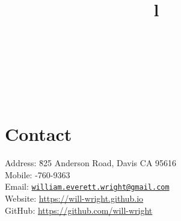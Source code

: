 \documentclass[12pt,margintitle,line]{res}
\begin{document}
\pagestyle{fancy}  
\fancyhf{}                  %
\renewcommand{\headrulewidth}{0.0pt}



\begin{resume}

\fancyhead{} %
\cfoot{\thepage}

\begin{format}
\\
\title{l}\\
\body\\
\end{format}

\section{Contact}
\vspace{-0.45cm}
\begin{tabbing}
Address: \= 825 Anderson Road, Davis CA 95616 \\
Mobile: -760-9363 \\
Email: \> \href{mailto:william.everett.wright@gmail.com}{\nolinkurl{william.everett.wright@gmail.com}} \\
Website: \> \url{https://will-wright.github.io} \\
GitHub: \> \url{https://github.com/will-wright} \\
\end{tabbing}


\end{resume}
\end{document}
